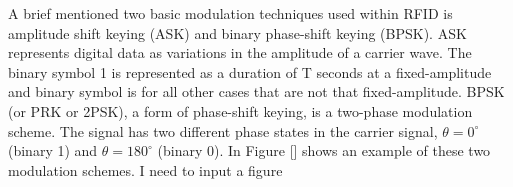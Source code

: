 A brief mentioned two basic modulation techniques used within RFID is amplitude shift keying (ASK) and binary phase-shift keying (BPSK). ASK represents digital data as variations in the amplitude of a carrier wave. The binary symbol 1 is represented as a duration of T seconds at a fixed-amplitude and binary symbol is for all other cases that are not that fixed-amplitude. BPSK (or PRK or 2PSK), a form of phase-shift keying, is a two-phase modulation scheme. The signal has two different phase states in the carrier signal, $\theta=0^\circ$ (binary 1) and $\theta=180^\circ$ (binary 0). In Figure [] shows an example of these two modulation schemes.
\newline
I need to input a figure